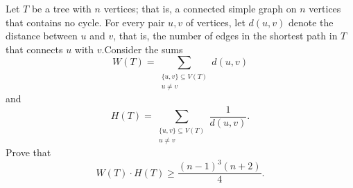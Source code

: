 \documentclass{article}
\begin{document}
\setlength{\parindent}{0pt}
Let \(\displaystyle T\) be a tree with \(\displaystyle n\) vertices; that is, a connected simple graph on \(\displaystyle n\) vertices that contains no cycle. For every pair \(\displaystyle u,v\) of vertices, let \(\displaystyle d(u,v)\) denote the distance between \(\displaystyle u\) and \(\displaystyle v\), that is, the number of edges in the shortest path in \(\displaystyle T\) that connects \(\displaystyle u\) with \(\displaystyle v\).\newline Consider the sums$$W(T)=\sum_{\substack{\{u,v\} \subseteq V(T)\\ u\ne v}} d(u,v)$$and$$H(T)=\sum_{\substack{\{u,v\} \subseteq V(T)\\ u\ne v}} \frac{1}{d(u,v)}.$$Prove that$$W(T)\cdot H(T)\geq \frac{(n-1)^{3}(n+2)}{4}.$$
\end{document}
